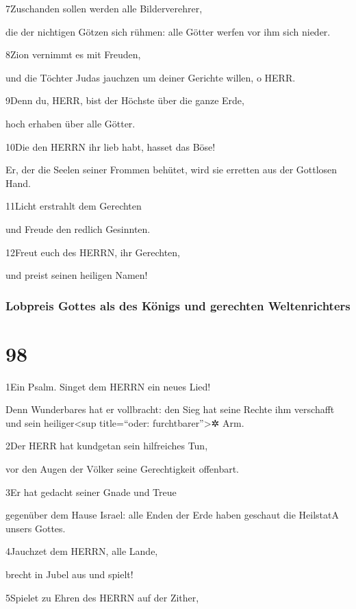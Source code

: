 7Zuschanden sollen werden alle Bilderverehrer,

die der nichtigen Götzen sich rühmen: alle Götter werfen vor ihm sich
nieder.

8Zion vernimmt es mit Freuden,

und die Töchter Judas jauchzen um deiner Gerichte willen, o HERR.

9Denn du, HERR, bist der Höchste über die ganze Erde,

hoch erhaben über alle Götter.

10Die den HERRN ihr lieb habt, hasset das Böse!

Er, der die Seelen seiner Frommen behütet, wird sie erretten aus der
Gottlosen Hand.

11Licht erstrahlt dem Gerechten

und Freude den redlich Gesinnten.

12Freut euch des HERRN, ihr Gerechten,

und preist seinen heiligen Namen!

\hypertarget{lobpreis-gottes-als-des-kuxf6nigs-und-gerechten-weltenrichters}{%
\subsubsection{Lobpreis Gottes als des Königs und gerechten
Weltenrichters}\label{lobpreis-gottes-als-des-kuxf6nigs-und-gerechten-weltenrichters}}

\hypertarget{section-97}{%
\section{98}\label{section-97}}

1Ein Psalm. Singet dem HERRN ein neues Lied!

Denn Wunderbares hat er vollbracht: den Sieg hat seine Rechte ihm
verschafft und sein heiliger\textless sup title=``oder:
furchtbarer''\textgreater✲ Arm.

2Der HERR hat kundgetan sein hilfreiches Tun,

vor den Augen der Völker seine Gerechtigkeit offenbart.

3Er hat gedacht seiner Gnade und Treue

gegenüber dem Hause Israel: alle Enden der Erde haben geschaut die
Heilstat{A} unsers Gottes.

4Jauchzet dem HERRN, alle Lande,

brecht in Jubel aus und spielt!

5Spielet zu Ehren des HERRN auf der Zither,

